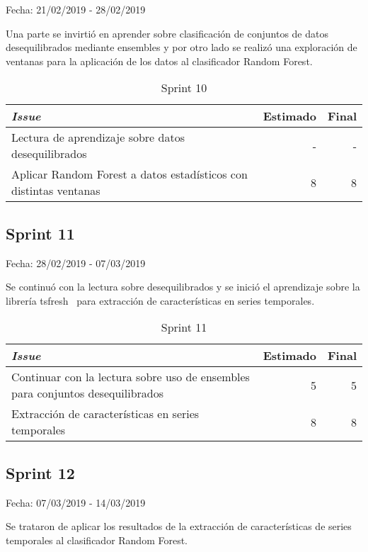 Fecha: 21/02/2019 - 28/02/2019

Una parte se invirtió en aprender sobre clasificación de conjuntos de datos desequilibrados mediante ensembles y por otro lado se realizó una exploración de ventanas para la aplicación de los datos al clasificador Random Forest. 

\begin{table}[H]
	\begin{tabularx}{\textwidth}{Xrr}
		\toprule \textbf{\textit{Issue}} & \textbf{Estimado} & \textbf{Final}\\
		\toprule 
		Lectura de aprendizaje sobre datos desequilibrados & - & - \\
		Aplicar Random Forest a datos estadísticos con distintas ventanas & 8 & 8 \\
		\bottomrule
	\end{tabularx}
	\caption{Sprint 10}
\end{table}

\subsection{Sprint 11}

Fecha: 28/02/2019 - 07/03/2019

Se continuó con la lectura sobre desequilibrados y se inició el aprendizaje sobre la librería tsfresh~\cite{tsfresh} para extracción de características en series temporales.  

\begin{table}[H]
	\begin{tabularx}{\textwidth}{Xrr}
		\toprule \textbf{\textit{Issue}} & \textbf{Estimado} & \textbf{Final}\\
		\toprule
		Continuar con la lectura sobre uso de ensembles para conjuntos desequilibrados & 5 & 5 \\
		Extracción de características en series temporales & 8 & 8 \\
		\bottomrule
	\end{tabularx}
	\caption{Sprint 11}
\end{table}

\subsection{Sprint 12}

Fecha: 07/03/2019 - 14/03/2019

Se trataron de aplicar los resultados de la extracción de características de series temporales al clasificador Random Forest. 

